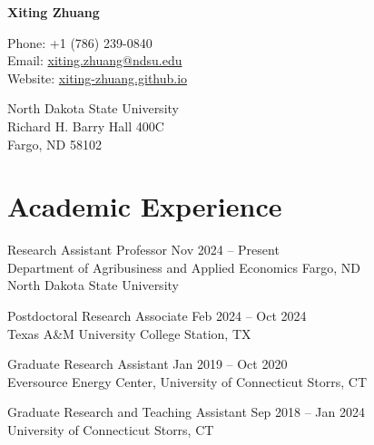 \documentclass[10.5pt,letterpaper]{article}
\def\name{Xiting Zhuang}
\renewenvironment{itemize}{
	\begin{list}{}{
			\setlength{\leftmargin}{1.5em}
		}
	}{
	\end{list}
}
\begin{document}
	
	{\huge \textbf{\name}}
	
	\vspace{0.25in}
	
	\begin{minipage}[t]{0.45\textwidth}
		Phone: +1 (786) 239-0840 \\
		Email: \href{mailto:xiting.zhuang@ndsu.edu}{xiting.zhuang@ndsu.edu} \\
		Website: \href{https://xiting-zhuang.github.io}{xiting-zhuang.github.io} \\
	\end{minipage}
	\begin{minipage}[t]{0.6\textwidth}
		North Dakota State University \\ 
		Richard H. Barry Hall 400C \\
		Fargo, ND 58102 \\
	\end{minipage}
	

	
\section*{\textbf{Academic Experience}}

\begin{itemize}
	
\item[-]  Research Assistant Professor \hfill Nov 2024 – Present \\
Department of Agribusiness and Applied Economics \hfill Fargo, ND \\[-2pt]  
North Dakota State University  

	

\item[-]  Postdoctoral Research Associate  \hfill Feb 2024 – Oct 2024 \\
 Texas A\&M University \hfill College Station, TX

\item[-]  Graduate Research Assistant \hfill Jan 2019 – Oct 2020 \\
Eversource Energy Center, University of Connecticut \hfill Storrs, CT

\item[-]  Graduate Research and Teaching Assistant  \hfill Sep 2018 – Jan 2024 \\
 University of Connecticut \hfill Storrs, CT

\end{itemize}
\end{document}
